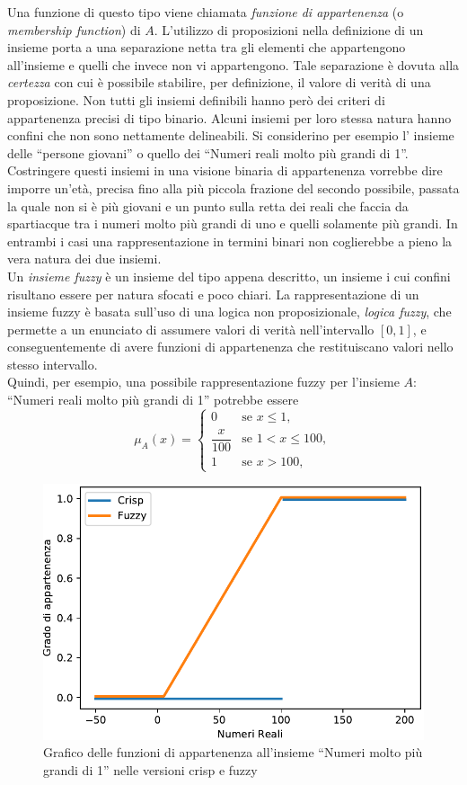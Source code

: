 \documentclass [11pt,a4paper,twoside,openright] {book}
\begin{document}
Una funzione di questo tipo viene chiamata \textit{funzione di appartenenza} (o \textit{membership function}) di $A$. L'utilizzo di proposizioni nella definizione di un insieme porta a una separazione netta tra gli elementi che appartengono all'insieme e quelli che invece non vi appartengono. Tale separazione è dovuta alla \textit{certezza} con cui è possibile stabilire, per definizione, il valore di verità di una proposizione. Non tutti gli insiemi definibili hanno però dei criteri di appartenenza precisi di tipo binario. Alcuni insiemi per loro stessa natura hanno confini che non sono nettamente delineabili. Si considerino per esempio l' insieme delle ``persone giovani'' o quello dei ``Numeri reali molto più grandi di 1''. Costringere questi insiemi in una visione binaria di appartenenza vorrebbe dire imporre un'età, precisa fino alla più piccola frazione del secondo possibile, passata la quale non si è più giovani e un punto sulla retta dei reali che faccia da spartiacque tra i numeri molto più grandi di uno e quelli solamente più grandi. In entrambi i casi una rappresentazione in termini binari non coglierebbe a pieno la vera natura dei due insiemi.\\
Un \textit{insieme fuzzy} è un insieme del tipo appena descritto, un insieme i cui confini risultano essere per natura sfocati e poco chiari. La rappresentazione di un insieme fuzzy è basata sull'uso di una logica non proposizionale, \textit{logica fuzzy}, che permette a un enunciato di assumere valori di verità nell'intervallo $[0, 1]$, e conseguentemente di avere funzioni di appartenenza che restituiscano valori nello stesso intervallo.\\
Quindi, per esempio, una possibile rappresentazione fuzzy per l'insieme $A$: ``Numeri reali molto più grandi di 1'' potrebbe essere
\[
\mu_{A}(x)=
\begin{cases}
0 & \text{se } x \leq 1 ,\\
\dfrac{x}{100} & \text{se }1 <  x \leq 100 ,\\
1 & \text{se } x > 100,
\end{cases}
\]
\begin{figure}[!b]
\centering
\includegraphics[scale=0.6]{figure/fuzzycrisp.pdf}
\caption{Grafico delle funzioni di appartenenza all'insieme ``Numeri molto più grandi di 1'' nelle versioni crisp e fuzzy \label{fuzzycrisp}}
\end{figure}
\end{document}
